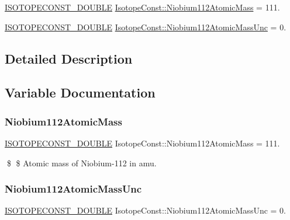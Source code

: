 \begin{DoxyCompactItemize}
\item 
\mbox{\hyperlink{group___isotope_const-_macros_ga8f45a7272ce02c0b4c65c44636ed719a}{I\+S\+O\+T\+O\+P\+E\+C\+O\+N\+S\+T\+\_\+\+D\+O\+U\+B\+LE}} \mbox{\hyperlink{group___isotope_const-_niobium-_nb112_ga507e571703f7aacd236f079c1e09a74d}{Isotope\+Const\+::\+Niobium112\+Atomic\+Mass}} = 111.
\item 
\mbox{\hyperlink{group___isotope_const-_macros_ga8f45a7272ce02c0b4c65c44636ed719a}{I\+S\+O\+T\+O\+P\+E\+C\+O\+N\+S\+T\+\_\+\+D\+O\+U\+B\+LE}} \mbox{\hyperlink{group___isotope_const-_niobium-_nb112_ga0a4cf5a2b8bf62496b51be17ba6c89f1}{Isotope\+Const\+::\+Niobium112\+Atomic\+Mass\+Unc}} = 0.
\end{DoxyCompactItemize}


\subsection{Detailed Description}


\subsection{Variable Documentation}
\mbox{\label{group___isotope_const-_niobium-_nb112_ga507e571703f7aacd236f079c1e09a74d}} 
\subsubsection{\texorpdfstring{Niobium112\+Atomic\+Mass}{Niobium112AtomicMass}}
{\footnotesize\ttfamily \mbox{\hyperlink{group___isotope_const-_macros_ga8f45a7272ce02c0b4c65c44636ed719a}{I\+S\+O\+T\+O\+P\+E\+C\+O\+N\+S\+T\+\_\+\+D\+O\+U\+B\+LE}} Isotope\+Const\+::\+Niobium112\+Atomic\+Mass = 111.}

\$ \$ Atomic mass of Niobium-\/112 in amu. \mbox{\label{group___isotope_const-_niobium-_nb112_ga0a4cf5a2b8bf62496b51be17ba6c89f1}} 
\subsubsection{\texorpdfstring{Niobium112\+Atomic\+Mass\+Unc}{Niobium112AtomicMassUnc}}
{\footnotesize\ttfamily \mbox{\hyperlink{group___isotope_const-_macros_ga8f45a7272ce02c0b4c65c44636ed719a}{I\+S\+O\+T\+O\+P\+E\+C\+O\+N\+S\+T\+\_\+\+D\+O\+U\+B\+LE}} Isotope\+Const\+::\+Niobium112\+Atomic\+Mass\+Unc = 0.}

